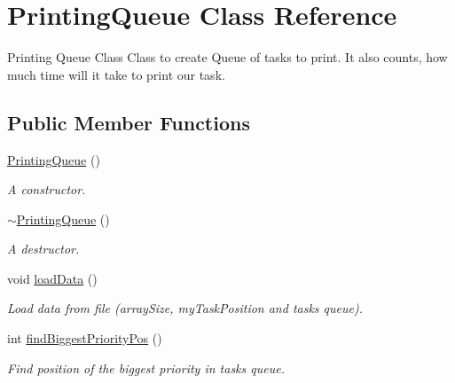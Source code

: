 \hypertarget{class_printing_queue}{}\section{Printing\+Queue Class Reference}
\label{class_printing_queue}


Printing Queue Class Class to create Queue of tasks to print. It also counts, how much time will it take to print our task.  


\subsection*{Public Member Functions}
\begin{DoxyCompactItemize}
\item 
\mbox{\label{class_printing_queue_ac10560ecfc1388979e36190757b48201}} 
\hyperlink{class_printing_queue_ac10560ecfc1388979e36190757b48201}{Printing\+Queue} ()
\begin{DoxyCompactList}\small\item\em A constructor. \end{DoxyCompactList}\item 
\mbox{\label{class_printing_queue_a4077ce9841f87ac1eed6a005e66c0e52}} 
\hyperlink{class_printing_queue_a4077ce9841f87ac1eed6a005e66c0e52}{$\sim$\+Printing\+Queue} ()
\begin{DoxyCompactList}\small\item\em A destructor. \end{DoxyCompactList}\item 
\mbox{\label{class_printing_queue_a8aa91d067d02c2715b173c890e87d9a5}} 
void \hyperlink{class_printing_queue_a8aa91d067d02c2715b173c890e87d9a5}{load\+Data} ()
\begin{DoxyCompactList}\small\item\em Load data from file (array\+Size, my\+Task\+Position and tasks queue). \end{DoxyCompactList}\item 
int \hyperlink{class_printing_queue_a5da114a3b589a9511b1888a42c4cab92}{find\+Biggest\+Priority\+Pos} ()
\begin{DoxyCompactList}\small\item\em Find position of the biggest priority in tasks queue. \end{DoxyCompactList}\item 

\end{DoxyCompactItemize}
